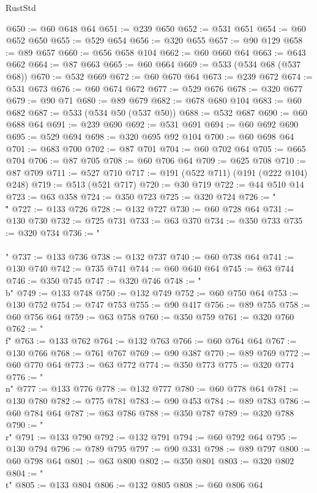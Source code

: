 \begin{lexlean}{RustStd}
\begin{coremodule}
@650 := @60 @648 @64
@651 := @239 @650
@652 := @531 @651
@654 := @60 @652 @650
@655 := @529 @654
@656 := @320 @655
@657 := @90 @129
@658 := @89 @657
@660 := @656 @658 @104
@662 := @60 @660 @64
@663 := @643 @662
@664 := @87 @663
@665 := @60 @664
@669 := @533 (@534 @68 (@537 @68))
@670 := @532 @669
@672 := @60 @670 @64
@673 := @239 @672
@674 := @531 @673
@676 := @60 @674 @672
@677 := @529 @676
@678 := @320 @677
@679 := @90 @71
@680 := @89 @679
@682 := @678 @680 @104
@683 := @60 @682
@687 := @533 (@534 @50 (@537 @50))
@688 := @532 @687
@690 := @60 @688 @64
@691 := @239 @690
@692 := @531 @691
@694 := @60 @692 @690
@695 := @529 @694
@698 := @320 @695 @92 @104
@700 := @60 @698 @64
@701 := @683 @700
@702 := @87 @701
@704 := @60 @702 @64
@705 := @665 @704
@706 := @87 @705
@708 := @60 @706 @64
@709 := @625 @708
@710 := @87 @709
@711 := @527 @710
@717 := @191 (@522 @711) (@191 (@222 @104) @248)
@719 := @513 (@521 @717)
@720 := @30 @719
@722 := @44 @510 @14
@723 := @63 @358
@724 := @350 @723
@725 := @320 @724
@726 := "\\\""
@727 := @133 @726
@728 := @132 @727
@730 := @60 @728 @64
@731 := @130 @730
@732 := @725 @731
@733 := @63 @370
@734 := @350 @733
@735 := @320 @734
@736 := "\\\\"
@737 := @133 @736
@738 := @132 @737
@740 := @60 @738 @64
@741 := @130 @740
@742 := @735 @741
@744 := @60 @640 @64
@745 := @63 @744
@746 := @350 @745
@747 := @320 @746
@748 := "\\b"
@749 := @133 @748
@750 := @132 @749
@752 := @60 @750 @64
@753 := @130 @752
@754 := @747 @753
@755 := @90 @417
@756 := @89 @755
@758 := @60 @756 @64
@759 := @63 @758
@760 := @350 @759
@761 := @320 @760
@762 := "\\f"
@763 := @133 @762
@764 := @132 @763
@766 := @60 @764 @64
@767 := @130 @766
@768 := @761 @767
@769 := @90 @387
@770 := @89 @769
@772 := @60 @770 @64
@773 := @63 @772
@774 := @350 @773
@775 := @320 @774
@776 := "\\n"
@777 := @133 @776
@778 := @132 @777
@780 := @60 @778 @64
@781 := @130 @780
@782 := @775 @781
@783 := @90 @453
@784 := @89 @783
@786 := @60 @784 @64
@787 := @63 @786
@788 := @350 @787
@789 := @320 @788
@790 := "\\r"
@791 := @133 @790
@792 := @132 @791
@794 := @60 @792 @64
@795 := @130 @794
@796 := @789 @795
@797 := @90 @331
@798 := @89 @797
@800 := @60 @798 @64
@801 := @63 @800
@802 := @350 @801
@803 := @320 @802
@804 := "\\t"
@805 := @133 @804
@806 := @132 @805
@808 := @60 @806 @64

\end{coremodule}
\end{lexlean}

